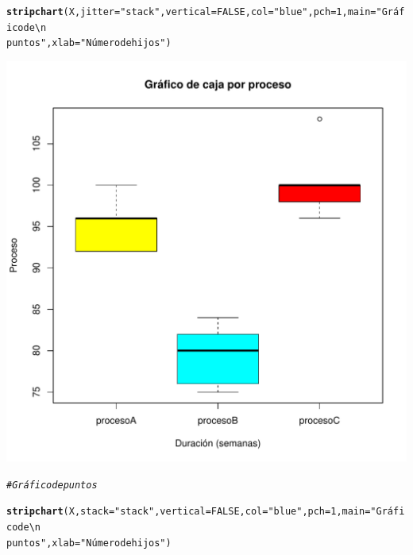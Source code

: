 \documentclass[12pt,letterpaper]{article}\usepackage[]{graphicx}\usepackage[]{color}
\makeatletter
\def\maxwidth{ %
  \ifdim\Gin@nat@width>\linewidth
    \linewidth
  \else
    \Gin@nat@width
  \fi
}
\newcommand{\hlnum}[1]{\textcolor[rgb]{0.686,0.059,0.569}{#1}}%
\newcommand{\hlstr}[1]{\textcolor[rgb]{0.192,0.494,0.8}{#1}}%
\newcommand{\hlcom}[1]{\textcolor[rgb]{0.678,0.584,0.686}{\textit{#1}}}%
\newcommand{\hlstd}[1]{\textcolor[rgb]{0.345,0.345,0.345}{#1}}%
\newcommand{\hlkwc}[1]{\textcolor[rgb]{0.333,0.667,0.333}{#1}}%
\newcommand{\hlkwd}[1]{\textcolor[rgb]{0.737,0.353,0.396}{\textbf{#1}}}%
\newenvironment{kframe}{%
 \def\at@end@of@kframe{}%
 \ifinner\ifhmode%
  \def\at@end@of@kframe{\end{minipage}}%
  \begin{minipage}{\columnwidth}%
 \fi\fi%
 \def\FrameCommand##1{\hskip\@totalleftmargin \hskip-\fboxsep
 \colorbox{shadecolor}{##1}\hskip-\fboxsep
     \hskip-\linewidth \hskip-\@totalleftmargin \hskip\columnwidth}%
 \MakeFramed {\advance\hsize-\width
   \@totalleftmargin\z@ \linewidth\hsize
   \@setminipage}}%
 {\par\unskip\endMakeFramed%
 \at@end@of@kframe}
\newenvironment{knitrout}{}{} %
\makeatother
\begin{document}
\begin{enumerate}
\begin{knitrout}
\begin{kframe}
\begin{alltt}
\hlkwd{stripchart}\hlstd{(X,} \hlkwc{jitter}\hlstd{=}\hlstr{"stack"}\hlstd{,} \hlkwc{vertical}\hlstd{=}\hlnum{FALSE}\hlstd{,} \hlkwc{col}\hlstd{=}\hlstr{"blue"}\hlstd{,} \hlkwc{pch}\hlstd{=}\hlnum{1}\hlstd{,} \hlkwc{main}\hlstd{=}\hlstr{"Gráfico de\textbackslash{}n 
puntos"}\hlstd{,} \hlkwc{xlab}\hlstd{=}\hlstr{"Número de hijos"}\hlstd{)}
\end{alltt}
\end{kframe}
\includegraphics[width=\maxwidth]{figure/unnamed-chunk-11-1} 

\end{knitrout}
\begin{knitrout}
\color{fgcolor}\begin{kframe}
\begin{alltt}
\hlcom{# Gráfico de puntos }

\hlkwd{stripchart}\hlstd{(X,} \hlkwc{stack}\hlstd{=}\hlstr{"stack"}\hlstd{,} \hlkwc{vertical}\hlstd{=}\hlnum{FALSE}\hlstd{,} \hlkwc{col}\hlstd{=}\hlstr{"blue"}\hlstd{,} \hlkwc{pch}\hlstd{=}\hlnum{1}\hlstd{,} \hlkwc{main}\hlstd{=}\hlstr{"Gráfico de\textbackslash{}n 
puntos"}\hlstd{,} \hlkwc{xlab}\hlstd{=}\hlstr{"Número de hijos"}\hlstd{)}
\end{alltt}


{\ttfamily\noindent{}}


\end{kframe}
\end{knitrout}
\end{enumerate}
\end{document}

